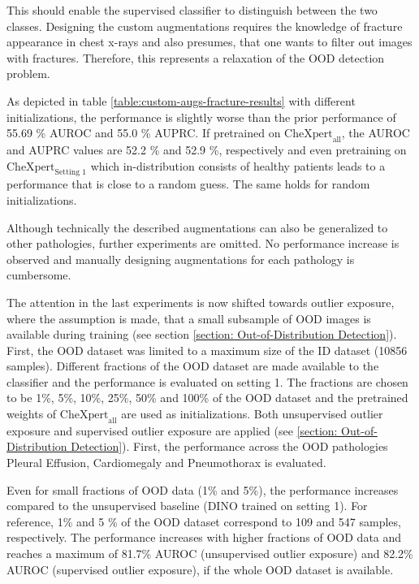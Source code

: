 This should enable the supervised classifier to distinguish between the two classes.
Designing the custom augmentations requires the knowledge of fracture appearance in chest x-rays and also presumes, that one wants to filter out images with fractures.
Therefore, this represents a relaxation of the OOD detection problem.
\par
As depicted in table \ref{table:custom-augs-fracture-results} with different initializations, the performance is slightly worse than the prior performance of 55.69 \% AUROC  and 55.0 \% AUPRC.
If pretrained on $\text{CheXpert}_\text{all}$, the AUROC and AUPRC values are 52.2 \% and 52.9 \%, respectively and even pretraining on $\text{CheXpert}_\text{Setting 1}$ which in-distribution consists of healthy patients leads to a performance that is close to a random guess.
The same holds for random initializations.
\par
Although technically the described augmentations can also be generalized to other pathologies, further experiments are omitted.
No performance increase is observed and manually designing augmentations for each pathology is cumbersome.
\par
The attention in the last experiments is now shifted towards outlier exposure, where the assumption is made, that a small subsample of OOD images is available during training (see section \ref{section: Out-of-Distribution Detection}).
First, the OOD dataset was limited to a maximum size of the ID dataset (10856 samples).
Different fractions of the OOD dataset are made available to the classifier and the performance is evaluated on setting 1.
The fractions are chosen to be 1\%, 5\%, 10\%, 25\%, 50\% and 100\% of the OOD dataset and the pretrained weights of $\text{CheXpert}_\text{all}$ are used as initializations.
Both unsupervised outlier exposure and supervised outlier exposure are applied (see \ref{section: Out-of-Distribution Detection}).
First, the performance across the OOD pathologies Pleural Effusion, Cardiomegaly and Pneumothorax is evaluated.
\par
Even for small fractions of OOD data (1\% and 5\%), the performance increases compared to the unsupervised baseline (DINO trained on setting 1).
For reference, 1\% and 5 \% of the OOD dataset correspond to 109 and 547 samples, respectively.
The performance increases with higher fractions of OOD data and reaches a maximum of 81.7\% AUROC (unsupervised outlier exposure) and 82.2\% AUROC (supervised outlier exposure), if the whole OOD dataset is available.
